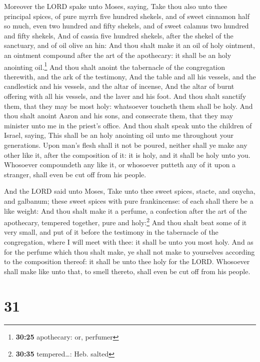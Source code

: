  Moreover the LORD spake unto Moses, saying,
 Take thou also unto thee principal spices, of pure myrrh
five hundred shekels, and of sweet cinnamon half so much, even two
hundred and fifty shekels, and of sweet calamus two hundred and fifty
shekels,  And of cassia five hundred shekels, after the
shekel of the sanctuary, and of oil olive an hin:  And
thou shalt make it an oil of holy ointment, an ointment compound after
the art of the apothecary: it shall be an holy anointing oil.\footnote{\textbf{30:25}
  apothecary: or, perfumer}  And thou shalt anoint the
tabernacle of the congregation therewith, and the ark of the testimony,
 And the table and all his vessels, and the candlestick
and his vessels, and the altar of incense,  And the altar
of burnt offering with all his vessels, and the laver and his foot.
 And thou shalt sanctify them, that they may be most
holy: whatsoever toucheth them shall be holy.  And thou
shalt anoint Aaron and his sons, and consecrate them, that they may
minister unto me in the priest's office.  And thou shalt
speak unto the children of Israel, saying, This shall be an holy
anointing oil unto me throughout your generations.  Upon
man's flesh shall it not be poured, neither shall ye make any other like
it, after the composition of it: it is holy, and it shall be holy unto
you.  Whosoever compoundeth any like it, or whosoever
putteth any of it upon a stranger, shall even be cut off from his
people.

 And the LORD said unto Moses, Take unto thee sweet
spices, stacte, and onycha, and galbanum; these sweet spices with pure
frankincense: of each shall there be a like weight:  And
thou shalt make it a perfume, a confection after the art of the
apothecary, tempered together, pure and holy:\footnote{\textbf{30:35}
  tempered\ldots: Heb. salted}  And thou shalt beat some
of it very small, and put of it before the testimony in the tabernacle
of the congregation, where I will meet with thee: it shall be unto you
most holy.  And as for the perfume which thou shalt make,
ye shall not make to yourselves according to the composition thereof: it
shall be unto thee holy for the LORD.  Whosoever shall
make like unto that, to smell thereto, shall even be cut off from his
people.

\hypertarget{section-30}{%
\section{31}\label{section-30}}

